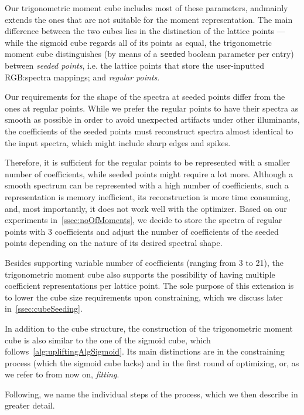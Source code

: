 Our trigonometric moment cube includes most of these parameters, and\newline mainly extends the ones that are not suitable for the moment representation. The main difference between the two cubes lies in the distinction of the lattice points --- while the sigmoid cube regards all of its points as equal, the trigonometric moment cube distinguishes (by means of a \texttt{seeded} boolean parameter per entry) between \emph{seeded points}, i.e. the lattice points that store the user-inputted RGB:spectra mappings; and \emph{regular points}.

Our requirements for the shape of the spectra at seeded points differ from the ones at regular points. While we prefer the regular points to have their spectra as smooth as possible in order to avoid unexpected artifacts under other illuminants, the coefficients of the seeded points must reconstruct spectra almost identical to the input spectra, which might include sharp edges and spikes.

Therefore, it is sufficient for the regular points to be represented with a smaller number of coefficients, while seeded points might require a lot more. Although a smooth spectrum can be represented with a high number of coefficients, such a representation is memory inefficient, its reconstruction is more time consuming, and, most importantly, it does not work well with the optimizer. Based on our experiments in~\cref{ssec:noOfMoments}, we decide to store the spectra of regular points with 3 coefficients and adjust the number of coefficients of the seeded points depending on the nature of its desired spectral shape.

Besides supporting variable number of coefficients (ranging from 3 to 21), the trigonometric moment cube also supports the possibility of having multiple coefficient representations per lattice point. The sole purpose of this extension is to lower the cube size requirements upon constraining, which we discuss later in~\cref{ssec:cubeSeeding}.

In addition to the cube structure, the construction of the trigonometric moment cube is also similar to the one of the sigmoid cube, which follows~\cref{alg:upliftingAlgSigmoid}. Its main distinctions are in the constraining process (which the sigmoid cube lacks) and in the first round of optimizing, or, as we refer to from now on, \emph{fitting}.

Following, we name the individual steps of the process, which we then describe in greater detail.

